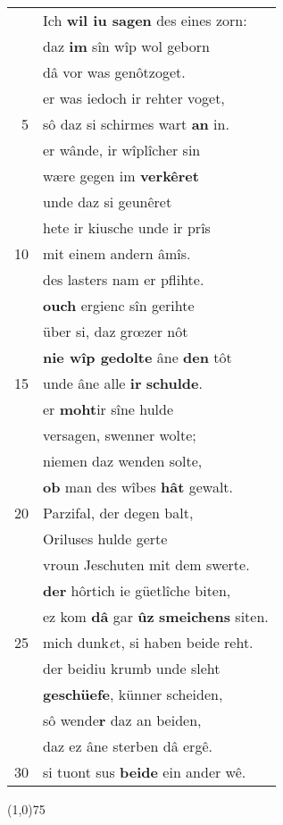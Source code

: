 \documentclass[8pt,a4paper,notitlepage]{article}
\begin{document}
\begin{table}[ht]
\begin{minipage}[t]{0.5\linewidth}
\begin{center}
\end{center}
\begin{tabular}{rl}
 & Ich \textbf{wil iu sagen} des eines zorn:\\ 
 & daz \textbf{im} sîn wîp wol geborn\\ 
 & dâ vor was genôtzoget.\\ 
 & er was iedoch ir rehter voget,\\ 
5 & sô daz si schirmes wart \textbf{an} in.\\ 
 & er wânde, ir wîplîcher sin\\ 
 & wære gegen im \textbf{verkêret}\\ 
 & unde daz si geunêret\\ 
 & hete ir kiusche unde ir prîs\\ 
10 & mit einem andern âmîs.\\ 
 & des lasters nam er pflihte.\\ 
 & \textbf{ouch} ergienc sîn gerihte\\ 
 & über si, daz grœzer nôt\\ 
 & \textbf{nie wîp gedolte} âne \textbf{den} tôt\\ 
15 & unde âne alle \textbf{ir} \textbf{schulde}.\\ 
 & er \textbf{moht}ir sîne hulde\\ 
 & versagen, swenner wolte;\\ 
 & niemen daz wenden solte,\\ 
 & \textbf{ob} man des wîbes \textbf{hât} gewalt.\\ 
20 & Parzifal, der degen balt,\\ 
 & Oriluses hulde gerte\\ 
 & vroun Jeschuten mit dem swerte.\\ 
 & \textbf{der} hôrtich ie güetlîche biten,\\ 
 & ez kom \textbf{dâ} gar \textbf{ûz} \textbf{smeichens} siten.\\ 
25 & mich dunk\textit{e}t, si haben beide reht.\\ 
 & der beidiu krumb unde sleht\\ 
 & \textbf{geschüefe}, künner scheiden,\\ 
 & sô wende\textbf{r} daz an beiden,\\ 
 & daz ez âne sterben dâ ergê.\\ 
30 & si tuont sus \textbf{beide} ein ander wê.\\ 
\end{tabular}
\scriptsize
\line(1,0){75} \newline

\end{minipage}
\end{table}
\end{document}
